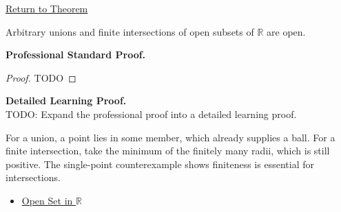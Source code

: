 \newpage
{}
\label{prf:open-set-closure-operations}

\begin{remark*}[Return]
\hyperref[thm:open-set-closure-operations]{Return to Theorem}
\end{remark*}

\begin{theorem*}
Arbitrary unions and finite intersections of open subsets of $\mathbb{R}$ are open.
\end{theorem*}

\textbf{Professional Standard Proof.}~\\
\begin{proof}
TODO
\end{proof}

\textbf{Detailed Learning Proof.}~\\
TODO: Expand the professional proof into a detailed learning proof.

\begin{remark*}
For a union, a point lies in some member, which already supplies a ball. For a finite intersection, take the minimum of the finitely many radii, which is still positive. The single-point counterexample shows finiteness is essential for intersections.
\end{remark*}

\begin{dependencies}
\begin{itemize}
  \item \hyperref[def:open-set]{Open Set in $\mathbb{R}$}
\end{itemize}
\end{dependencies}
